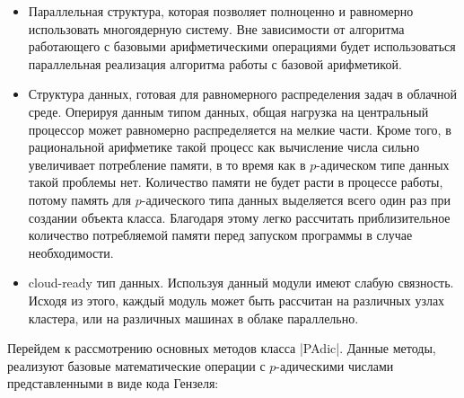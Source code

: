 \documentclass[master, och, diploma, times]{sty/SCWorks}
\theoremstyle{plain}
\theoremstyle{definition}
\numberwithin{equation}{section}
\begin{document}
\begin{itemize}
\item Параллельная структура, которая позволяет полноценно и равномерно использовать многоядерную систему. Вне зависимости от алгоритма работающего с базовыми арифметическими операциями будет использоваться параллельная реализация алгоритма работы с базовой арифметикой.
\item Структура данных, готовая для равномерного распределения задач в облачной среде. Оперируя данным типом данных, общая нагрузка на центральный процессор может равномерно распределяется на мелкие части. Кроме того, в рациональной арифметике такой процесс как вычисление числа сильно увеличивает потребление памяти, в то время как в $p$-адическом типе данных такой проблемы нет. Количество памяти не будет расти в процессе работы, потому память для $p$-адического типа данных выделяется всего один раз при создании объекта класса. Благодаря этому легко рассчитать приблизительное количество потребляемой памяти перед запуском программы в случае необходимости.
\item cloud-ready тип данных. Используя данный модули имеют слабую связность. Исходя из этого, каждый модуль может быть рассчитан на различных узлах кластера, или на различных машинах в облаке параллельно.
\end{itemize}

Перейдем к рассмотрению основных методов класса |PAdic|. Данные методы, реализуют базовые математические операции с $p$-адическими числами представленными в виде кода Гензеля:
\end{document}
